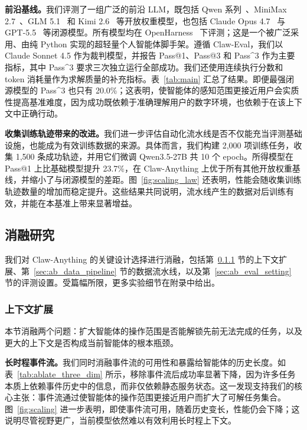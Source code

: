 \documentclass[10pt]{article}
\begin{document}
\textbf{前沿基线。}我们评测了一组广泛的前沿 LLM，既包括 Qwen 系列~\citep{qwen3p5,qwen3p6-27b}、MiniMax 2.7~\citep{minimax_m27}、GLM 5.1~\citep{GLM51} 和 Kimi 2.6~\citep{kimi26} 等开放权重模型，也包括 Claude Opus 4.7~\citep{opus47} 与 GPT-5.5~\citep{openai_gpt55} 等闭源模型。所有模型均在 OpenHarness~\citep{openharness} 下评测；这是一个被广泛采用、由纯 Python 实现的超轻量个人智能体脚手架。遵循 Claw-Eval，我们以 Claude Sonnet 4.5 作为裁判模型，并报告 Pass@1、Pass@3 和 Pass\textasciicircum{}3 作为主要指标，其中 Pass\textasciicircum{}3 要求三次独立运行全部成功。我们还使用连续执行分数和 token 消耗量作为求解质量的补充指标。表~\ref{tab:main} 汇总了结果。即便最强闭源模型的 Pass\textasciicircum{}3 也只有 20.0\%；这表明，使智能体的感知范围更接近用户会实质性提高基准难度，因为成功既依赖于准确理解用户的数字环境，也依赖于在该上下文中正确行动。

\textbf{收集训练轨迹带来的改进。}我们进一步评估自动化流水线是否不仅能充当评测基础设施，也能成为有效训练数据的来源。具体而言，我们构建 2,000 项训练任务，收集 1,500 条成功轨迹，并用它们微调 Qwen3.5-27B 共 10 个 epoch。所得模型在 Pass@1 上比基础模型提升 23.7\%，在 Claw-Anything 上优于所有其他开放权重基线，并缩小了与闭源模型的差距。图~\ref{fig:scaling_law} 还表明，性能会随收集训练轨迹数量的增加而稳定提升。这些结果共同说明，流水线产生的数据对后训练有效，并能在本基准上带来显著增益。

\subsection{消融研究}

我们对 Claw-Anything 的关键设计选择进行消融，包括第~\ref{sec:ab_scaling_context} 节的上下文扩展、第~\ref{sec:ab_data_pipeline} 节的数据流水线，以及第~\ref{sec:ab_eval_setting} 节的评测设置。受篇幅所限，更多实验细节在附录中给出。

\subsubsection{上下文扩展}
\label{sec:ab_scaling_context}

本节消融两个问题：扩大智能体的操作范围是否能解锁先前无法完成的任务，以及更大的上下文是否构成当前智能体的根本瓶颈。

\textbf{长时程事件流。}我们同时消融事件流的可用性和暴露给智能体的历史长度。如表~\ref{tab:ablate_three_dim} 所示，移除事件流后成功率显著下降，因为许多任务本质上依赖事件历史中的信息，而非仅依赖静态服务状态。这一发现支持我们的核心主张：事件流通过使智能体的操作范围更接近用户而扩大了可解任务集合。图~\ref{fig:scaling} 进一步表明，即使事件流可用，随着历史变长，性能仍会下降；这说明尽管视野更广，当前模型依然难以有效利用长时程上下文。
\end{document}
